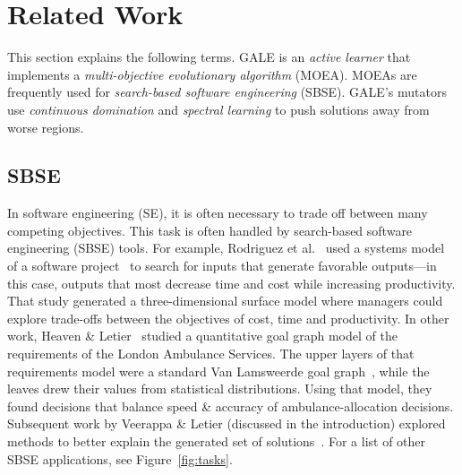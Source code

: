\documentclass[10pt,journal,compsoc]{IEEEtran}
\newcommand{\fig}[1]{Figure~\ref{fig:#1}}
\begin{document}







\section{Related Work}
This section explains the following terms.
GALE is an {\em active learner} that implements a {\em multi-objective evolutionary algorithm} (MOEA).
MOEAs are frequently used for {\em search-based software engineering} (SBSE).
GALE's mutators use  {\em continuous domination} and {\em spectral learning}
to push solutions away from worse regions.

\subsection{SBSE}


In software engineering (SE), it is often necessary to trade
off between many competing objectives.  This task is often handled
by search-based software engineering (SBSE) tools.
For example, Rodriguez et
al.~\cite{rod11} used a systems model of a software project~\cite{deb00afast}
 to search for inputs that generate favorable outputs---in this case, outputs that
most decrease time and cost while increasing productivity. That study
generated a three-dimensional surface model where managers could explore
trade-offs between the objectives of cost, time and productivity.  In other
work, Heaven \& Letier~\cite{heaven11} studied a quantitative
goal graph model of the requirements of the London Ambulance
Services. The upper layers of that requirements model were a standard
Van Lamsweerde goal graph~\cite{lam00}, while the leaves drew their
values from statistical distributions. Using that model, they found
decisions that balance speed \& accuracy of ambulance-allocation
decisions. Subsequent work by Veerappa \& Letier (discussed in the introduction)
explored methods to better explain the generated set of solutions~\cite{veer11}.
For a list of other SBSE applications, see \fig{tasks}.
\end{document}
